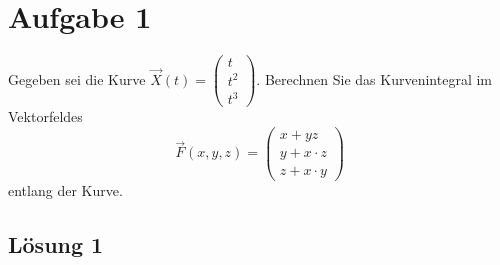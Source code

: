 \documentclass[main.tex]{subfiles}
\begin{document}
\section{Aufgabe 1}
Gegeben sei die Kurve 
$\vec{X}(t) = \begin{pmatrix} t \\ t^2 \\ t^3 \end{pmatrix}$.
Berechnen Sie das Kurvenintegral im Vektorfeldes
\[
\vec{F}(x,y,z) 
= \begin{pmatrix} x + yz \\ y + x \cdot z \\ z + x \cdot y \end{pmatrix}
\]
entlang der Kurve.

\subsection{Lösung 1}
\end{document}
